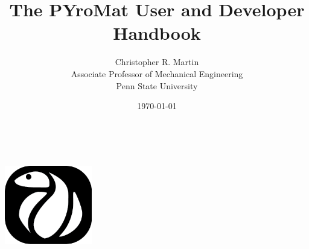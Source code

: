 \documentclass[11pt]{report}
\title{The PYroMat User and Developer Handbook}
\author{Christopher R. Martin\\
Associate Professor of Mechanical Engineering\\
Penn State University}
\date{\today}
\begin{document}
\ \\
\vspace{2in}

\begin{center}
\includegraphics[width=1.5in]{figures/PYro_Black_Small}
\end{center}
\pagebreak

\maketitle

\tableofcontents













\end{document}
